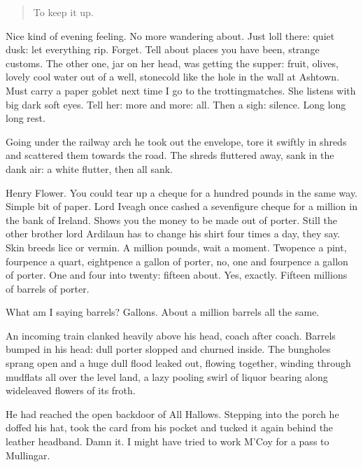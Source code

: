 \begin{verse}
    To keep it up.
\end{verse}

Nice kind of evening feeling.
No more wandering about.
Just loll there:
quiet dusk:
let everything rip.
Forget.
Tell about places you have been,
strange customs.
The other one,
jar on her head,
was getting the supper:
fruit, olives,
lovely cool water out of a well,
stonecold like the hole in the wall at Ashtown.
Must carry a paper goblet next time I go to the trottingmatches.
She listens with big dark soft eyes.
Tell her:
more and more:
all.
Then a sigh:
silence.
Long long long rest.

Going under the railway arch
he took out the envelope,
tore it swiftly in shreds
and scattered them towards the road.
The shreds fluttered away,
sank in the dank air:
a white flutter, then all sank.

Henry Flower.
You could tear up a cheque for a hundred pounds in the same way.
Simple bit of paper.
Lord Iveagh once cashed a sevenfigure cheque for a million in the bank of Ireland.
Shows you the money to be made out of porter.
Still the other brother
lord Ardilaun
has to change his shirt four times a day,
they say.
Skin breeds lice or vermin.
A million pounds, wait a moment.
Twopence a pint,
fourpence a quart,
eightpence a gallon of porter,
no, one and fourpence a gallon of porter.
One and four into twenty:
fifteen about.
Yes, exactly.
Fifteen millions of barrels of porter.

What am I saying barrels?
Gallons.
About a million barrels all the same.

An incoming train clanked heavily above his head, coach after coach.
Barrels bumped in his head:
dull porter slopped and churned inside.
The bungholes sprang open and a huge dull flood leaked out,
flowing together,
winding through mudflats all over the level land,
a lazy pooling swirl of liquor
bearing along wideleaved flowers of its froth.

He had reached the open backdoor of All Hallows.
Stepping into the porch
he doffed his hat,
took the card from his pocket
and tucked it again behind the leather headband.
Damn it.
I might have tried to work M'Coy for a pass to Mullingar.

